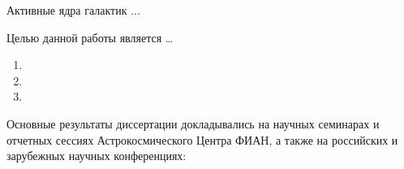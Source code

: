 
{\actuality}

Активные ядра галактик ...



{\aim}

Целью данной работы является \ldots

{\novelty}



{}
\begin{enumerate}
  \item
  \item
  \item
\end{enumerate}


{\reliability}

{\probation}

Основные результаты диссертации докладывались на научных семинарах и отчетных
сессиях Астрокосмического Центра ФИАН, а также на российских и зарубежных научных конференциях:

